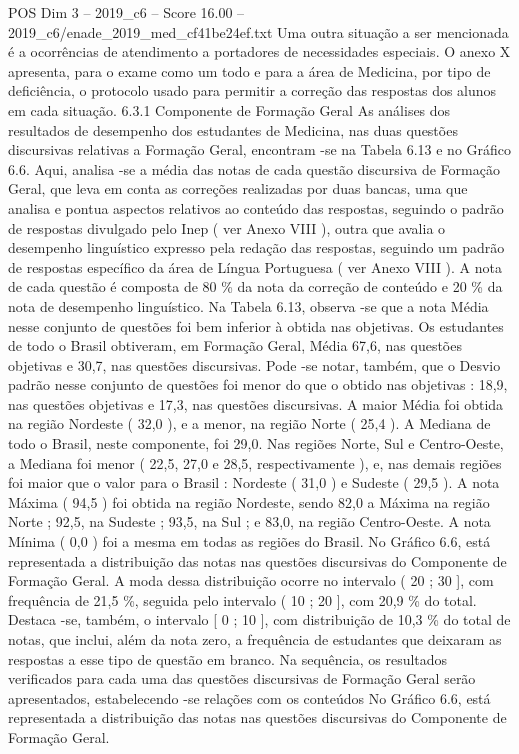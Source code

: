 \begin{textsample}{POS Dim 3 – 2019\_c6 – Score 16.00 – 2019\_c6/enade\_2019\_med\_cf41be24ef.txt}
Uma outra situação a ser mencionada é a ocorrências de atendimento a portadores de necessidades especiais.
O anexo X apresenta, para o exame como um todo e para a área de Medicina, por tipo de deficiência, o protocolo usado para permitir a correção das respostas dos alunos em cada situação. 6.3.1 Componente de Formação Geral As análises dos resultados de desempenho dos estudantes de Medicina, nas duas questões discursivas relativas a Formação Geral, encontram -se na Tabela 6.13 e no Gráfico 6.6.
Aqui, analisa -se a média das notas de cada questão discursiva de Formação Geral, que leva em conta as correções realizadas por duas bancas, uma que analisa e pontua aspectos relativos ao conteúdo das respostas, seguindo o padrão de respostas divulgado pelo Inep ( ver Anexo VIII ), outra que avalia o desempenho linguístico expresso pela redação das respostas, seguindo um padrão de respostas específico da área de Língua Portuguesa ( ver Anexo VIII ).
A nota de cada questão é composta de 80 \% da nota da correção de conteúdo e 20 \% da nota de desempenho linguístico.
Na Tabela 6.13, observa -se que a nota Média nesse conjunto de questões foi bem inferior à obtida nas objetivas.
Os estudantes de todo o Brasil obtiveram, em Formação Geral, Média 67,6, nas questões objetivas e 30,7, nas questões discursivas.
Pode -se notar, também, que o Desvio padrão nesse conjunto de questões foi menor do que o obtido nas objetivas : 18,9, nas questões objetivas e 17,3, nas questões discursivas.
A maior Média foi obtida na região Nordeste ( 32,0 ), e a menor, na região Norte ( 25,4 ).
A Mediana de todo o Brasil, neste componente, foi 29,0.
Nas regiões Norte, Sul e Centro-Oeste, a Mediana foi menor ( 22,5, 27,0 e 28,5, respectivamente ), e, nas demais regiões foi maior que o valor para o Brasil : Nordeste ( 31,0 ) e Sudeste ( 29,5 ).
A nota Máxima ( 94,5 ) foi obtida na região Nordeste, sendo 82,0 a Máxima na região Norte ; 92,5, na Sudeste ; 93,5, na Sul ; e 83,0, na região Centro-Oeste.
A nota Mínima ( 0,0 ) foi a mesma em todas as regiões do Brasil.
No Gráfico 6.6, está representada a distribuição das notas nas questões discursivas do Componente de Formação Geral.
A moda dessa distribuição ocorre no intervalo ( 20 ; 30 ], com frequência de 21,5 \%, seguida pelo intervalo ( 10 ; 20 ], com 20,9 \% do total.
Destaca -se, também, o intervalo [ 0 ; 10 ], com distribuição de 10,3 \% do total de notas, que inclui, além da nota zero, a frequência de estudantes que deixaram as respostas a esse tipo de questão em branco.
Na sequência, os resultados verificados para cada uma das questões discursivas de Formação Geral serão apresentados, estabelecendo -se relações com os conteúdos No Gráfico 6.6, está representada a distribuição das notas nas questões discursivas do Componente de Formação Geral.

\end{textsample}
